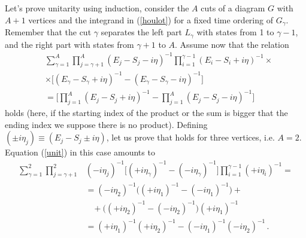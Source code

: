 \documentclass[%
 reprint,
 amsmath,amssymb,
 aps,
]{revtex4-1}
\begin{document}
Let's prove unitarity using induction, consider the $A$ cuts of a diagram $G$ with $A+1$ vertices and the integrand in (\ref{houlot}) for a fixed time ordering of $G_\gamma$. Remember that the cut $\gamma$ separates the left part $L_\gamma$ with states from 1 to $\gamma-1$, and the right part with states from $\gamma+1$ to $A$. Assume now that the relation
\begin{align}
&\sum_{\gamma=1}^A \prod_{j=\gamma+1}^A(E_j-S_j-i\eta)^{-1}\prod_{i=1}^{\gamma-1}(E_i-S_i+i\eta)^{-1}\times\nonumber\\
&\times\Big[(E_\gamma-S_\gamma+i\eta)^{-1}-(E_\gamma-S_\gamma-i\eta)^{-1}\Big]\nonumber\\
&=\Big[\prod_{j=1}^A(E_j-S_j+i\eta)^{-1}-\prod_{j=1}^A(E_j-S_j-i\eta)^{-1}\Big]\label{unit}
\end{align}
holds (here, if the starting index of the product or the sum is bigger that the ending index we suppose there is no product). Defining $(\pm i\eta_j)\equiv(E_j-S_j\pm i\eta)$, let us prove that holds for three vertices, i.e. $A=2$. Equation (\ref{unit}) in this case amounts to
\begin{align}
\sum_{\gamma=1}^2 \prod_{j=\gamma+1}^2&(-i\eta_j)^{-1}\Big[(+i\eta_\gamma)^{-1}-(-i\eta_\gamma)^{-1}\Big]\prod_{i=1}^{\gamma-1}(+i\eta_i)^{-1}=\nonumber\\
&=(-i\eta_2)^{-1}\Big((+i\eta_1)^{-1}-(-i\eta_1)^{-1}\Big)+\nonumber\\
&\;\;\;+\Big((+i\eta_2)^{-1}-(-i\eta_2)^{-1}\Big)(+i\eta_1)^{-1}\nonumber\\
&=(+i\eta_1)^{-1}(+i\eta_2)^{-1}-(-i\eta_1)^{-1}(-i\eta_2)^{-1}\,.
\end{align}
\end{document}
